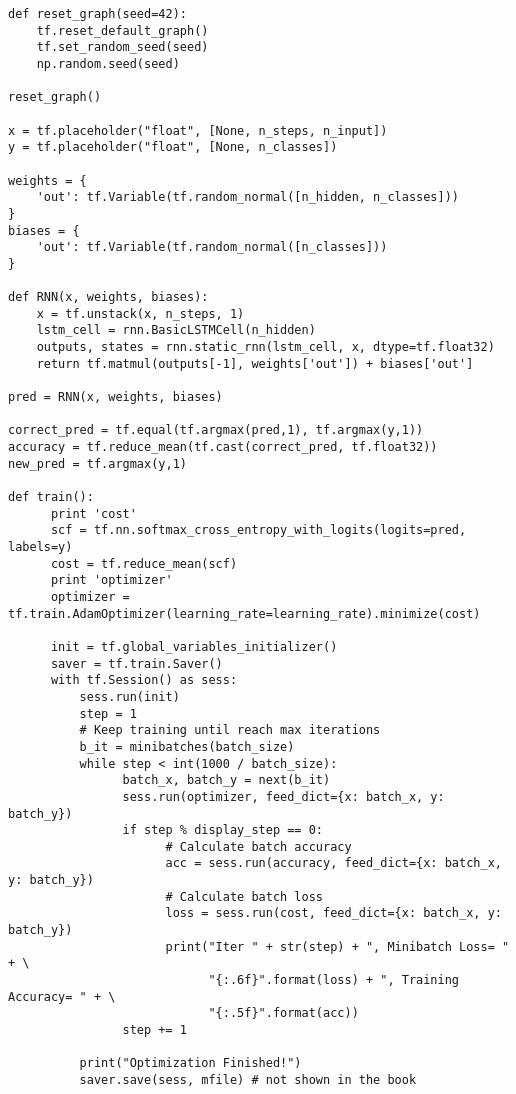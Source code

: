 \documentclass[12pt,fleqn]{article}\usepackage{../../common}
\begin{document}
\begin{verbatim}
def reset_graph(seed=42):
    tf.reset_default_graph()
    tf.set_random_seed(seed)
    np.random.seed(seed)

reset_graph()

x = tf.placeholder("float", [None, n_steps, n_input])
y = tf.placeholder("float", [None, n_classes])

weights = {
    'out': tf.Variable(tf.random_normal([n_hidden, n_classes]))
}
biases = {
    'out': tf.Variable(tf.random_normal([n_classes]))
}

def RNN(x, weights, biases):
    x = tf.unstack(x, n_steps, 1)
    lstm_cell = rnn.BasicLSTMCell(n_hidden)
    outputs, states = rnn.static_rnn(lstm_cell, x, dtype=tf.float32)
    return tf.matmul(outputs[-1], weights['out']) + biases['out']

pred = RNN(x, weights, biases)

correct_pred = tf.equal(tf.argmax(pred,1), tf.argmax(y,1))
accuracy = tf.reduce_mean(tf.cast(correct_pred, tf.float32))
new_pred = tf.argmax(y,1)

def train():
      print 'cost'
      scf = tf.nn.softmax_cross_entropy_with_logits(logits=pred, labels=y)
      cost = tf.reduce_mean(scf)
      print 'optimizer'
      optimizer = tf.train.AdamOptimizer(learning_rate=learning_rate).minimize(cost)
      
      init = tf.global_variables_initializer()
      saver = tf.train.Saver()
      with tf.Session() as sess:
          sess.run(init)
          step = 1
          # Keep training until reach max iterations
          b_it = minibatches(batch_size)
          while step < int(1000 / batch_size):
                batch_x, batch_y = next(b_it)
                sess.run(optimizer, feed_dict={x: batch_x, y: batch_y})
                if step % display_step == 0:
                      # Calculate batch accuracy
                      acc = sess.run(accuracy, feed_dict={x: batch_x, y: batch_y})
                      # Calculate batch loss
                      loss = sess.run(cost, feed_dict={x: batch_x, y: batch_y})
                      print("Iter " + str(step) + ", Minibatch Loss= " + \
                            "{:.6f}".format(loss) + ", Training Accuracy= " + \
                            "{:.5f}".format(acc))
                step += 1

          print("Optimization Finished!")
          saver.save(sess, mfile) # not shown in the book
\end{verbatim}
\end{document}
